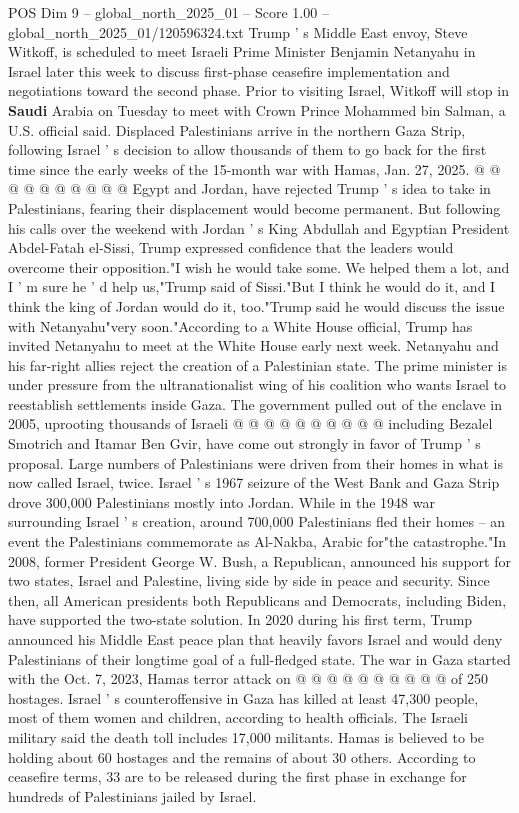 \begin{textsample}{POS Dim 9 – global\_north\_2025\_01 – Score 1.00 – global\_north\_2025\_01/120596324.txt}
Trump ' s Middle East envoy, Steve Witkoff, is scheduled to meet Israeli Prime Minister Benjamin Netanyahu in Israel later this week to discuss first-phase ceasefire implementation and negotiations toward the second phase.
Prior to visiting Israel, Witkoff will stop in \textbf{Saudi} Arabia on Tuesday to meet with Crown Prince Mohammed bin Salman, a U.S. official said.
Displaced Palestinians arrive in the northern Gaza Strip, following Israel ' s decision to allow thousands of them to go back for the first time since the early weeks of the 15-month war with Hamas, Jan. 27, 2025. @ @ @ @ @ @ @ @ @ @ Egypt and Jordan, have rejected Trump ' s idea to take in Palestinians, fearing their displacement would become permanent.
But following his calls over the weekend with Jordan ' s King Abdullah and Egyptian President Abdel-Fatah el-Sissi, Trump expressed confidence that the leaders would overcome their opposition."I wish he would take some.
We helped them a lot, and I ' m sure he ' d help us,"Trump said of Sissi."But I think he would do it, and I think the king of Jordan would do it, too."Trump said he would discuss the issue with Netanyahu"very soon."According to a White House official, Trump has invited Netanyahu to meet at the White House early next week.
Netanyahu and his far-right allies reject the creation of a Palestinian state.
The prime minister is under pressure from the ultranationalist wing of his coalition who wants Israel to reestablish settlements inside Gaza.
The government pulled out of the enclave in 2005, uprooting thousands of Israeli @ @ @ @ @ @ @ @ @ @ including Bezalel Smotrich and Itamar Ben Gvir, have come out strongly in favor of Trump ' s proposal.
Large numbers of Palestinians were driven from their homes in what is now called Israel, twice.
Israel ' s 1967 seizure of the West Bank and Gaza Strip drove 300,000 Palestinians mostly into Jordan.
While in the 1948 war surrounding Israel ' s creation, around 700,000 Palestinians fled their homes -- an event the Palestinians commemorate as Al-Nakba, Arabic for"the catastrophe."In 2008, former President George W.
Bush, a Republican, announced his support for two states, Israel and Palestine, living side by side in peace and security.
Since then, all American presidents both Republicans and Democrats, including Biden, have supported the two-state solution.
In 2020 during his first term, Trump announced his Middle East peace plan that heavily favors Israel and would deny Palestinians of their longtime goal of a full-fledged state.
The war in Gaza started with the Oct. 7, 2023, Hamas terror attack on @ @ @ @ @ @ @ @ @ @ of 250 hostages.
Israel ' s counteroffensive in Gaza has killed at least 47,300 people, most of them women and children, according to health officials.
The Israeli military said the death toll includes 17,000 militants.
Hamas is believed to be holding about 60 hostages and the remains of about 30 others.
According to ceasefire terms, 33 are to be released during the first phase in exchange for hundreds of Palestinians jailed by Israel.

\end{textsample}
